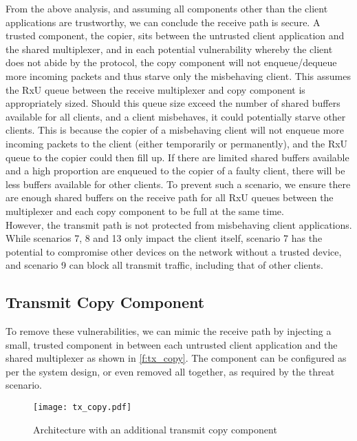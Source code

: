 From the above analysis, and assuming all components other than the client applications are trustworthy,
we can conclude the receive path is secure. A trusted component, the copier, sits between the untrusted client application
and the shared multiplexer, and in each potential vulnerability whereby the client does not abide by the protocol, the copy component
will not enqueue/dequeue more incoming packets and thus starve only the misbehaving client. This assumes the RxU queue between 
the receive multiplexer and copy component is appropriately sized. Should this queue size exceed the number of shared buffers
available for all clients, and a client misbehaves, it could potentially starve other clients. This is because the copier
of a misbehaving client will not enqueue more incoming packets to the client (either temporarily or permanently), and the RxU queue
to the copier could then fill up. If there are limited shared buffers available and a high proportion are enqueued to the copier
of a faulty client, there will be less buffers available for other clients. To prevent such a scenario, we ensure there are enough
shared buffers on the receive path for all RxU queues between the multiplexer and each copy component to be full at the same time.\\

However, the transmit path is not protected from misbehaving client applications. While scenarios 7, 8 and 13 only impact the client
itself, scenario 7 has the potential to compromise other devices on the network without a trusted device, and scenario 9 can block
all transmit traffic, including that of other clients.\\

\subsection{Transmit Copy Component}

To remove these vulnerabilities, we can mimic the receive path by injecting a small, trusted component in between each untrusted
client application and the shared multiplexer as shown in \autoref{f:tx_copy}. The component can be configured as
per the system design, or even removed all together, as required by the threat scenario.

\begin{figure}[h]
    \centering
    \texttt{[image: tx\_copy.pdf]}
    \caption{Architecture with an additional transmit copy component}
    \label{f:tx_copy}
\end{figure}

